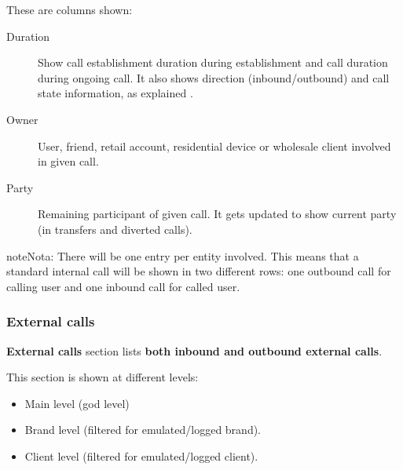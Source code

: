 \documentclass[letterpaper,10pt,spanish]{sphinxmanual}
\begin{document}
These are columns shown:
\begin{description}
\item[{Duration}] \leavevmode{}\label{administration_portal/client/retail/calls/active_calls:term-duration}
Show call establishment duration during establishment and call duration during ongoing call. It also shows
direction (inbound/outbound) and call state information, as explained {\hyperref[administration_portal/platform/active_calls:call\string-state]{}}.

\item[{Owner}] \leavevmode{}\label{administration_portal/client/retail/calls/active_calls:term-owner}
User, friend, retail account, residential device or wholesale client involved in given call.

\item[{Party}] \leavevmode{}\label{administration_portal/client/retail/calls/active_calls:term-party}
Remaining participant of given call. It gets updated to show current party (in transfers and diverted calls).

\end{description}

\begin{notice}{note}{Nota:}
There will be one entry per entity involved. This means that a standard internal call will be shown
in two different rows: one outbound call for calling user and one inbound call for called user.
\end{notice}


\subsubsection{External calls}
\label{administration_portal/client/retail/calls/external_calls:id1}\label{administration_portal/client/retail/calls/external_calls::doc}\label{administration_portal/client/retail/calls/external_calls:external-calls}
\textbf{External calls} section lists \textbf{both inbound and outbound external calls}.

This section is shown at different levels:
\begin{itemize}
\item {} 
Main level (god level)

\item {} 
Brand level (filtered for emulated/logged brand).

\item {} 
Client level (filtered for emulated/logged client).

\end{itemize}
\end{document}
